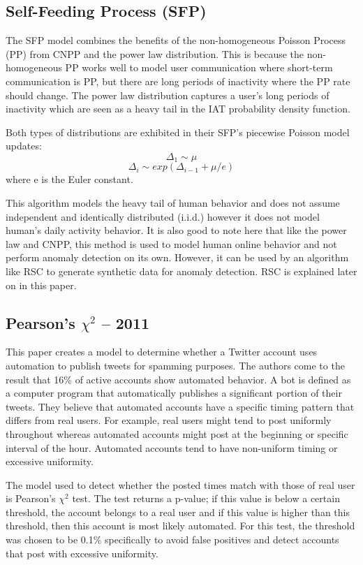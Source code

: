 \documentclass[11pt, oneside]{article}   	%
\begin{document}
\subsection*{Self-Feeding Process (SFP) }

\quad The SFP model \cite{sfp} combines the benefits of the non-homogeneous Poisson Process (PP) from CNPP and the power law distribution.
This is because the non-homogeneous PP works well to model user communication where short-term communication is PP, but there are long periods of inactivity where the PP rate should change.
The power law distribution captures a user's long periods of inactivity which are seen as a heavy tail in the IAT probability density function.

\quad Both types of distributions are exhibited in their SFP's piecewise Poisson model updates:
$$ \Delta_1 \sim \mu $$
$$ \Delta_i \sim exp(\Delta_{i-1} + \mu / e) $$
where e is the Euler constant.

\quad This algorithm models the heavy tail of human behavior and does not assume independent and identically distributed (i.i.d.) however it does not model human's daily activity behavior. It is also good to note here that like the power law and CNPP, this method is used to model human online behavior and not perform anomaly detection on its own. However, it can be used by an algorithm like RSC \cite{rsc} to generate synthetic data for anomaly detection. RSC is explained later on in this paper.

\subsection*{Pearson's $\chi^2$ -- 2011}

\quad This paper creates a model to determine whether a Twitter account uses automation to publish tweets for spamming purposes. 
The authors come to the result that 16\% of active accounts show automated behavior.
A bot is defined as a computer program that automatically publishes a significant portion of their tweets.
They believe that automated accounts have a specific timing pattern that differs from real users.
For example, real users might tend to post uniformly throughout whereas automated accounts might post at the beginning or specific interval of the hour.
Automated accounts tend to have non-uniform timing or excessive uniformity.

\quad The model used to detect whether the posted times match with those of real user is Pearson's $\chi^2$ test.
The test returns a p-value; if this value is below a certain threshold, the account belongs to a real user and if this value is higher than this threshold, then this account is most likely automated.
For this test, the threshold was chosen to be 0.1\% specifically to avoid false positives and detect accounts that post with excessive uniformity.
\end{document}
